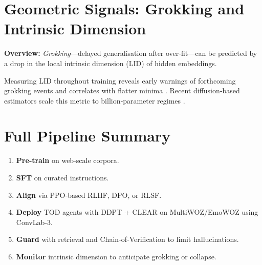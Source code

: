\documentclass[11pt]{article}
\begin{document}
\section{Geometric Signals: Grokking and Intrinsic Dimension}
\textbf{Overview:}  \emph{Grokking}—delayed generalisation after over‑fit—can be predicted by a drop in the local intrinsic dimension (LID) of hidden embeddings.

Measuring LID throughout training reveals early warnings of forthcoming grokking events and correlates with flatter minima \citep{junior2025lid}.  Recent diffusion‑based estimators scale this metric to billion‑parameter regimes \citep{tempczyk2022lid}.

\section{Full Pipeline Summary}
\begin{enumerate}
\item \textbf{Pre‑train} on web‑scale corpora.
\item \textbf{SFT} on curated instructions.
\item \textbf{Align} via PPO‑based RLHF, DPO, or RLSF.
\item \textbf{Deploy} TOD agents with DDPT + CLEAR on MultiWOZ/EmoWOZ using ConvLab‑3.
\item \textbf{Guard} with retrieval and Chain‑of‑Verification to limit hallucinations.
\item \textbf{Monitor} intrinsic dimension to anticipate grokking or collapse.
\end{enumerate}

\newpage


\end{document}
